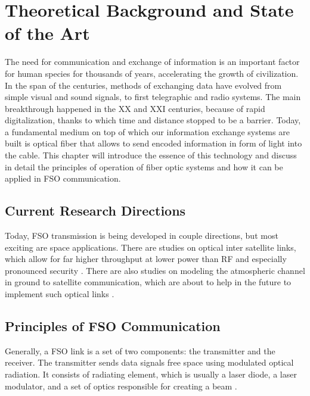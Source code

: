 \documentclass[master,oneside,en,oldtitlepage]{dyplompwr}
\begin{document}
\chapter{Theoretical Background and State of the Art}

The need for communication and exchange of information is an important factor for human species for thousands of years, accelerating the growth of civilization. In the span of the centuries, methods of exchanging data have evolved from simple visual and sound signals, to first telegraphic and radio systems. The main breakthrough happened in the XX and XXI centuries, because of rapid digitalization, thanks to which time and distance stopped to be a barrier. Today, a fundamental medium on top of which our information exchange systems are built is optical fiber that allows to send encoded information in form of light into the cable. This chapter will introduce the essence of this technology and discuss in detail the principles of operation of fiber optic systems and how it can be applied in FSO communication.

\section{Current Research Directions}
Today, FSO transmission is being developed in couple directions, but most exciting are space applications. There are studies on optical inter satellite links, which allow for far higher throughput at lower power than RF and especially pronounced security \cite{ingersoll2020technical}. There are also studies on modeling the atmospheric channel in ground to satellite communication, which are about to help in the future to implement such optical links \cite{Czerwinskietal2025}.


\section{Principles of FSO Communication}

Generally, a FSO link is a set of two components: the transmitter and the receiver. 
The transmitter sends data signals free space using modulated optical radiation. 
It consists of radiating element, which is usually a laser diode, a laser modulator, and a set of optics responsible for creating a beam \cite{majumdar2014fundamentals}.
\end{document}
